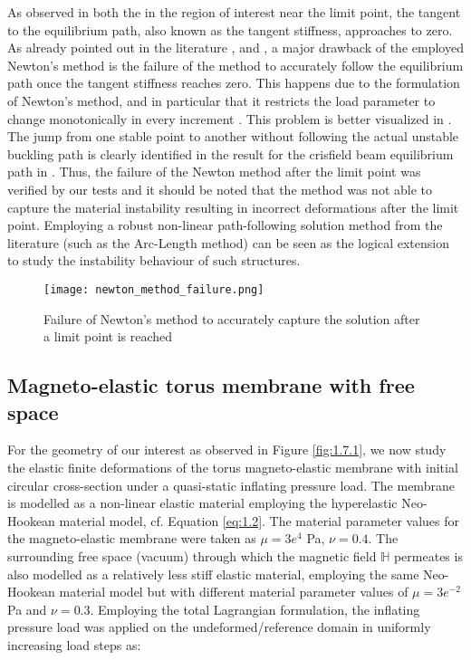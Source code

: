 As observed in both the  in the region of interest near the limit point, the tangent to the equilibrium path, also known as the tangent stiffness, approaches to zero. As already pointed out in the literature \cite{Riks1979}, \cite{CRISFIELD1981} and \cite{Vasios}, a major drawback of the employed Newton's method is the failure of the method to accurately follow the equilibrium path once the tangent stiffness reaches zero. This happens due to the formulation of Newton's method, and in particular that it restricts the load parameter to change monotonically in every increment \cite{Vasios}. This problem is better visualized in . The jump from one stable point to another without following the actual unstable buckling path is clearly identified in the result for the crisfield beam equilibrium path in . Thus, the failure of the Newton method after the limit point was verified by our tests and it should be noted that the method was not able to capture the material instability resulting in incorrect deformations after the limit point. Employing a robust non-linear path-following solution method from the literature \cite{CRISFIELD1981} (such as the Arc-Length method) can be seen as the logical extension to study the instability behaviour of such structures. \par 

\begin{figure}[h]
\centering
\texttt{[image: newton\_method\_failure.png]}
\caption{Failure of Newton's method to accurately capture the solution after a limit point is reached \cite{Vasios}}
\label{fig:1.17}
\end{figure}

\subsection{Magneto-elastic torus membrane with free space}
For the geometry of our interest as observed in Figure \eqref{fig:1.7.1}, we now study the elastic finite deformations of the torus magneto-elastic membrane with initial circular cross-section under a quasi-static inflating pressure load. The membrane is modelled as a non-linear elastic material employing the hyperelastic Neo-Hookean material model, cf. Equation \eqref{eq:1.2}. The material parameter values for the magneto-elastic membrane were taken as $\mu = 3e^4$ Pa, $\nu = 0.4$. The surrounding free space (vacuum) through which the magnetic field $\mathbb{H}$ permeates is also modelled as a relatively less stiff elastic material, employing the same Neo-Hookean material model but with different material parameter values of $\mu = 3e^{-2}$ Pa and $\nu = 0.3$. Employing the total Lagrangian formulation, the inflating pressure load was applied on the undeformed/reference domain in uniformly increasing load steps as:

